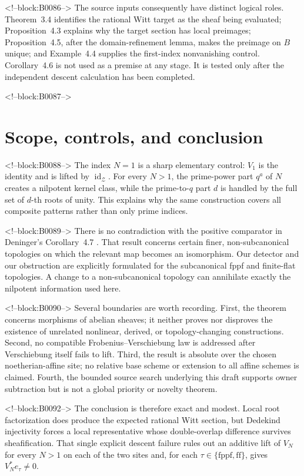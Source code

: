 \documentclass[11pt]{article}
\theoremstyle{definition}
\newcommand{\Zsh}{\mathcal Z}
\newcommand{\ff}{\mathrm{ff}}
\newcommand{\fppf}{\mathrm{fppf}}
\begin{document}
<!--block:B0086-->
The source inputs consequently have distinct logical roles.
Theorem~3.4 identifies the rational Witt target as the sheaf being
evaluated; Proposition~4.3 explains why the target section has local
preimages; Proposition~4.5, after the domain-refinement lemma, makes the
preimage on \(B\) unique; and Example~4.4 supplies the first-index
nonvanishing control.  Corollary~4.6 is not used as a premise at any stage.
It is tested only after the independent descent calculation has been
completed.

<!--block:B0087-->
\section{Scope, controls, and conclusion}\label{sec:scope}

<!--block:B0088-->
The index \(N=1\) is a sharp elementary control: \(V_1\) is the identity
and is lifted by \(\operatorname{id}_{\Zsh}\).  For every \(N>1\), the
prime-power part \(q^a\) of \(N\) creates a nilpotent kernel class, while
the prime-to-\(q\) part \(d\) is handled by the full set of \(d\)-th roots
of unity.  This explains why the same construction covers all composite
patterns rather than only prime indices.

<!--block:B0089-->
There is no contradiction with the positive comparator in Deninger's
Corollary~4.7 \cite[p.~24]{Deninger2025Rational}.  That result concerns
certain finer, non-subcanonical topologies on which the relevant map
becomes an isomorphism.  Our detector and our obstruction are explicitly
formulated for the subcanonical fppf and finite-flat topologies.  A change
to a non-subcanonical topology can annihilate exactly the nilpotent
information used here.

<!--block:B0090-->
Several boundaries are worth recording.  First, the theorem concerns
morphisms of abelian sheaves; it neither proves nor disproves the existence
of unrelated nonlinear, derived, or topology-changing constructions.
Second, no compatible Frobenius--Verschiebung law is addressed after
Verschiebung itself fails to lift.  Third, the result is absolute over the
chosen noetherian-affine site; no relative base scheme or extension to all
affine schemes is claimed.  Fourth, the bounded source search underlying
this draft supports owner subtraction but is not a global priority or
novelty theorem.

<!--block:B0092-->
The conclusion is therefore exact and modest.  Local root factorization
does produce the expected rational Witt section, but Dedekind injectivity
forces a local representative whose double-overlap difference survives
sheafification.  That single explicit descent failure rules out an additive lift of \(V_N\)
for every \(N>1\) on each of the two sites and, for each
\(\tau\in\{\fppf,\ff\}\), gives \(V_N^*e_\tau\ne0\).
\end{document}
